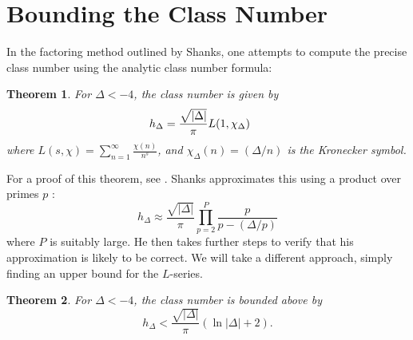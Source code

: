 \documentclass[honours,12pt]{unswthesis}
\newtheorem{theorem}{Theorem}[section]
\numberwithin{equation}{section}
\begin{document}
\pagebreak
\section{Bounding the Class Number} \label{s-class-number-formula}

In the factoring method outlined by Shanks, one attempts to compute the precise class number using the analytic class number formula:
\vspace{2mm}
\begin{theorem}
    For $\Delta < -4$, the class number is given by
    $$h_\Delta = \frac{\sqrt{|\Delta|}}{\pi} L(1, \chi_\Delta) \hspace{5mm}$$
    where $L(s, \chi) = \sum_{n = 1}^{\infty} \frac{\chi(n)}{n^s}$, and $\chi_\Delta(n) = (\Delta / n)$ is the Kronecker symbol.
\end{theorem}
\vspace{2mm}
For a proof of this theorem, see \cite[\S\,10.5]{jarvis}.
Shanks approximates this using a product over primes $p$ \cite[\S\,2]{shanks}:
$$h_\Delta \approx \frac{\sqrt{|\Delta|}}{\pi} \prod_{p=2}^{P} \frac{p}{p - (\Delta / p)}$$
where $P$ is suitably large.
He then takes further steps to verify that his approximation is likely to be correct.
We will take a different approach, simply finding an upper bound for the $L$-series.
\vspace{2mm}
\begin{theorem} \label{thm-h-bound}
    For $\Delta < -4$, the class number is bounded above by
    $$h_\Delta < \frac{\sqrt{|\Delta|}}{\pi}(\ln|\Delta| + 2).$$
\end{theorem}
\end{document}
